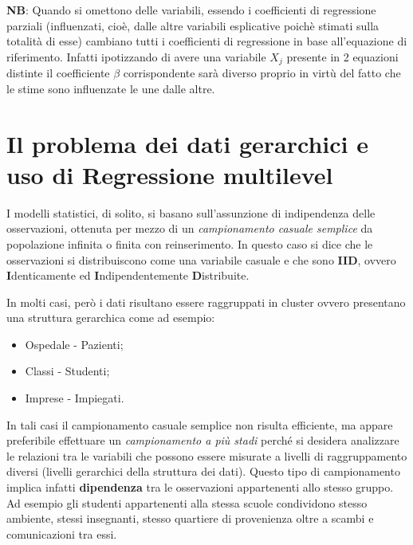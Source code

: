 \documentclass[a4page, 11pt]{article} %
\begin{document}
\newline
\newline
\textbf{NB}: Quando si omettono delle variabili, essendo i coefficienti di regressione parziali (influenzati, cioè, dalle altre variabili esplicative poichè stimati sulla totalità di esse) cambiano tutti i coefficienti di regressione in base all'equazione di riferimento. Infatti ipotizzando di avere una variabile $X_j$ presente in 2 equazioni distinte il coefficiente $\beta$ corrispondente sarà diverso proprio in virtù del fatto che le stime sono influenzate le une dalle altre.

\section{Il problema dei dati gerarchici e uso di Regressione multilevel}

I modelli statistici, di solito, si basano sull'assunzione di indipendenza delle osservazioni, ottenuta per mezzo di un \textit{campionamento casuale semplice} da popolazione infinita o finita con reinserimento. In questo caso si dice che le osservazioni si distribuiscono come una variabile casuale e che sono \textbf{IID}, ovvero \textbf{I}denticamente ed \textbf{I}ndipendentemente \textbf{D}istribuite.
 
In molti casi, però i dati risultano essere raggruppati in cluster ovvero presentano una struttura gerarchica come ad esempio:
\begin{itemize}
\item  Ospedale - Pazienti;
\item  Classi - Studenti;
\item Imprese - Impiegati.
\end{itemize}
 In tali casi il campionamento casuale semplice non risulta efficiente, ma appare preferibile effettuare un \textit{campionamento a più stadi} perché si desidera analizzare le relazioni tra le variabili che possono essere misurate a livelli di raggruppamento diversi (livelli gerarchici della struttura dei dati). Questo tipo di campionamento implica infatti \textbf{dipendenza} tra le osservazioni appartenenti allo stesso gruppo. Ad esempio gli studenti appartenenti alla stessa scuole condividono stesso ambiente, stessi insegnanti, stesso quartiere di provenienza oltre a scambi e comunicazioni tra essi.
\end{document}
